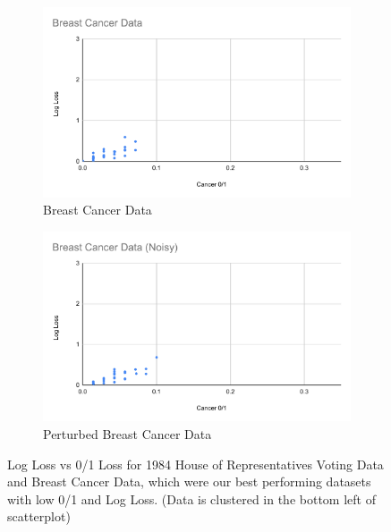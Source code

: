 \documentclass[twoside,11pt]{article}
\begin{document}
\begin{figure}[h!]
   \begin{subfigure}[b]{0.45\linewidth}
    \includegraphics[width=\linewidth]{images/BC.pdf}
    \caption{Breast Cancer Data}
  \end{subfigure}
  \begin{subfigure}[b]{0.45\linewidth}
    \includegraphics[width=\linewidth]{images/BC(noise).pdf}
    \caption{Perturbed Breast Cancer Data}
  \end{subfigure}
  \caption{Log Loss vs 0/1 Loss for 1984 House of Representatives Voting Data and Breast Cancer Data, which were our best performing datasets with low 0/1 and Log Loss. (Data is clustered in the bottom left of scatterplot)}
  \label{fig:good}
\end{figure}
  
\end{document}
